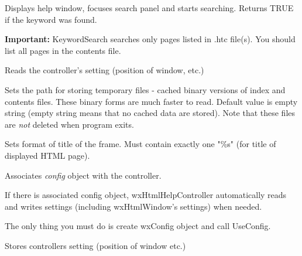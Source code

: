\label{wxhtmlhelpcontrollerkeywordsearch}


Displays help window, focuses search panel and starts searching.
Returns TRUE if the keyword was found.

{\bf Important:} KeywordSearch searches only pages listed in .htc file(s).
You should list all pages in the contents file.

\label{wxhtmlhelpcontrollerreadcustomization}


Reads the controller's setting (position of window, etc.)

\label{wxhtmlhelpcontrollersettempdir}


Sets the path for storing temporary files - cached binary versions of index and contents files. These binary
forms are much faster to read. Default value is empty string (empty string means
that no cached data are stored). Note that these files are {\it not} 
deleted when program exits.

\label{wxhtmlhelpcontrollersettitleformat}


Sets format of title of the frame. Must contain exactly one "\%s"
(for title of displayed HTML page).

\label{wxhtmlhelpcontrolleruseconfig}


Associates {\it config} object with the controller.

If there is associated config object, wxHtmlHelpController automatically
reads and writes settings (including wxHtmlWindow's settings) when needed.

The only thing you must do is create wxConfig object and call UseConfig. 

\label{wxhtmlhelpcontrollerwritecustomization}


Stores controllers setting (position of window etc.)

